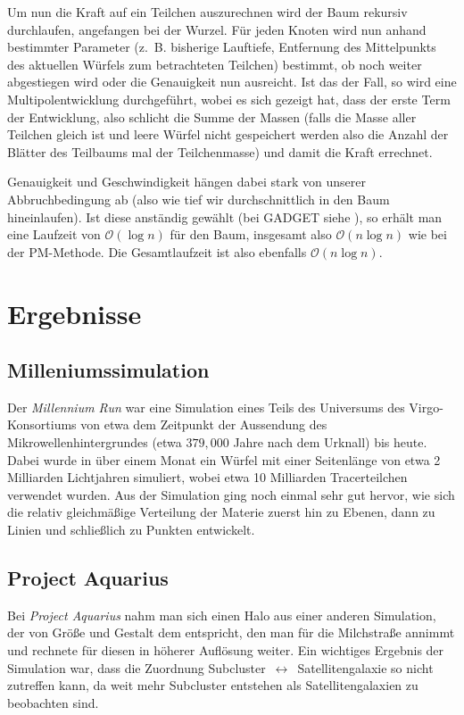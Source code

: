 \documentclass[a4paper]{scrartcl}
\begin{document}
Um nun die Kraft auf ein Teilchen auszurechnen wird der Baum rekursiv
durchlaufen, angefangen bei der Wurzel. Für jeden Knoten wird nun anhand
bestimmter Parameter (z.~B. bisherige Lauftiefe, Entfernung des Mittelpunkts des
aktuellen Würfels zum betrachteten Teilchen) bestimmt, ob noch weiter
abgestiegen wird oder die Genauigkeit nun ausreicht. Ist das der Fall, so wird
eine Multipolentwicklung durchgeführt, wobei es sich gezeigt hat, dass der erste
Term der Entwicklung, also schlicht die Summe der Massen (falls die Masse aller
Teilchen gleich ist und leere Würfel nicht gespeichert werden also die Anzahl
der Blätter des Teilbaums mal der Teilchenmasse) und damit die Kraft errechnet.

Genauigkeit und Geschwindigkeit hängen dabei stark von unserer Abbruchbedingung
ab (also wie tief wir durchschnittlich in den Baum hineinlaufen). Ist diese
anständig gewählt (bei GADGET siehe \cite{gadget-abbruch}), so erhält man eine
Laufzeit von $\mathcal{O}(\log n)$ für den Baum, insgesamt also $\mathcal
O(n\log n)$ wie bei der PM-Methode. Die Gesamtlaufzeit ist also ebenfalls
$\mathcal O(n\log n)$.

\section{Ergebnisse}
\subsection{Milleniumssimulation}
Der \emph{Millennium Run} war eine Simulation eines Teils des Universums des
Virgo-Konsortiums von etwa dem Zeitpunkt der Aussendung des
Mikrowellenhintergrundes (etwa $379,000$ Jahre nach dem Urknall) bis heute.
Dabei wurde in über einem Monat ein Würfel mit einer Seitenlänge von etwa 2
Milliarden Lichtjahren simuliert, wobei etwa 10 Milliarden Tracerteilchen
verwendet wurden. Aus der Simulation ging noch einmal sehr gut hervor, wie sich
die relativ gleichmäßige Verteilung der Materie zuerst hin zu Ebenen, dann zu Linien
und schließlich zu Punkten entwickelt.

\subsection{Project Aquarius}
Bei \emph{Project Aquarius} nahm man sich einen Halo aus einer anderen
Simulation, der von Größe und Gestalt dem entspricht, den man für die
Milchstraße annimmt und rechnete für diesen in höherer Auflösung weiter. Ein
wichtiges Ergebnis der Simulation war, dass die Zuordnung
Subcluster~$\leftrightarrow$~Satellitengalaxie so nicht zutreffen kann, da weit
mehr Subcluster entstehen als Satellitengalaxien zu beobachten
sind.
\end{document}
